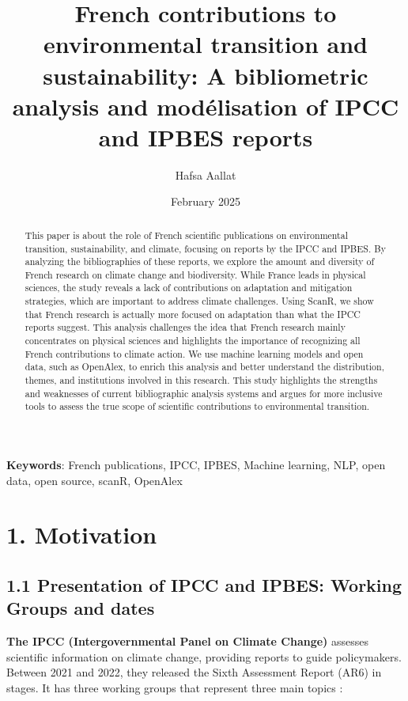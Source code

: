 \documentclass[
]{article}
\title{French contributions to environmental transition and
sustainability: A bibliometric analysis and modélisation of IPCC and
IPBES reports}
\author[%
  1%
  ]{%
  Hafsa Aallat%
}
\affil[1]{French Ministry of Higher Education and Research, Paris,
France}
\date{February 2025}
\begin{document}
\maketitle
\begin{abstract}
This paper is about the role of French scientific publications on
environmental transition, sustainability, and climate, focusing on
reports by the IPCC and IPBES. By analyzing the bibliographies of these
reports, we explore the amount and diversity of French research on
climate change and biodiversity. While France leads in physical
sciences, the study reveals a lack of contributions on adaptation and
mitigation strategies, which are important to address climate
challenges. Using ScanR, we show that French research is actually more
focused on adaptation than what the IPCC reports suggest. This analysis
challenges the idea that French research mainly concentrates on physical
sciences and highlights the importance of recognizing all French
contributions to climate action. We use machine learning models and open
data, such as OpenAlex, to enrich this analysis and better understand
the distribution, themes, and institutions involved in this research.
This study highlights the strengths and weaknesses of current
bibliographic analysis systems and argues for more inclusive tools to
assess the true scope of scientific contributions to environmental
transition.
\end{abstract}

\textbf{Keywords}: French publications, IPCC, IPBES, Machine learning,
NLP, open data, open source, scanR, OpenAlex

\hypertarget{motivation}{%
\section{1. Motivation}\label{motivation}}

\hypertarget{presentation-of-ipcc-and-ipbes-working-groups-and-dates}{%
\subsection{1.1 Presentation of IPCC and IPBES: Working Groups and
dates}\label{presentation-of-ipcc-and-ipbes-working-groups-and-dates}}

\textbf{The IPCC (Intergovernmental Panel on Climate Change)} assesses
scientific information on climate change, providing reports to guide
policymakers. Between 2021 and 2022, they released the Sixth Assessment
Report (AR6) in stages. It has three working groups that represent three
main topics :
\end{document}
